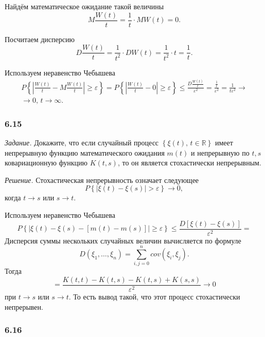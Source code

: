 Найдём математическое ожидание такой величины
$$M \frac{W \left( t \right) }{t} =
  \frac{1}{t} \cdot MW \left( t \right) =
  0.$$

Посчитаем дисперсию
$$D \frac{W \left( t \right) }{t} =
  \frac{1}{t^2} \cdot DW \left( t \right) =
  \frac{1}{t^2} \cdot t =
  \frac{1}{t}.$$

Используем неравенство Чебышева
\begin{gather*}
  P \left\{
    \left| \frac{W \left( t \right) }{t} - M \frac{W \left( t \right) }{t} \right| \geq \varepsilon
  \right\} =
  P \left\{ \left| \frac{W \left( t \right) }{t} - 0 \right| \geq \varepsilon \right\} \leq
  \frac{D \frac{W \left( t \right) }{t}}{ \varepsilon^2} =
  \frac{ \frac{1}{t}}{ \varepsilon^2} =
  \frac{1}{t \varepsilon^2} \to \\
  \to 0, \,
  t \to \infty.
\end{gather*}

\subsubsection*{6.15}

\textit{Задание.}
Докажите, что если случайный процесс $ \left\{ \xi \left( t \right), \, t \in \mathbb{R} \right\} $
имеет непрерывную функцию математического ожидания $m \left( t \right) $ и непрерывную по $t, s$
ковариационную функцию $K \left( t, s \right) $, то он является стохастически непрерывным.

\textit{Решение.}
Стохастическая непрерывность означает следующее
$$P \left\{ \left| \xi \left( t \right) - \xi \left( s \right) \right| > \varepsilon \right\} \to
  0,$$
когда $t \to s$ или $s \to t$.

Используем неравенство Чебышева
$$P \left\{
    \left|
      \xi \left( t \right) - \xi \left( s \right) -
      \left[ m \left( t \right) - m \left( s \right) \right] \right| \geq \varepsilon \right\} \leq
  \frac{D \left[ \xi \left( t \right) - \xi \left( s \right) \right] }{ \varepsilon^2} =$$
Дисперсия суммы нескольких случайных величин вычисляется по формуле
$$D \left( \xi_1, \dotsc, \xi_n \right) =
  \sum \limits_{i, j = 0}^n cov \left( \xi_i, \xi_j \right).$$
Тогда
$$= \frac{K \left( t, t \right) - K \left( t, s \right) - K \left( t, s \right) + K \left( s, s \right) }{ \varepsilon^2} \to
  0$$
при $t \to s$ или $s \to t$.
То есть вывод такой, что этот процесс стохастически непрерывен.

\subsubsection*{6.16}

